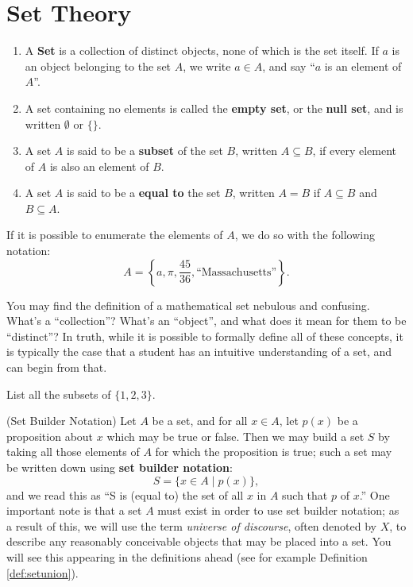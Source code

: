 \section{Set Theory}\label{sec:settheory}

\begin{definition} \leavevmode
\begin{enumerate}
    \item \label{def:set} A \textbf{Set} is a collection of distinct objects, none of which is the set itself.  If $a$ is an object belonging to the set $A$, we write $a \in A$, and say ``$a$ is an element of $A$''.
    \item \label{def:nullset} A set containing no elements is called the \textbf{empty set}, or the \textbf{null set}, and is written $\emptyset$ or $\{ \}$.
    \item \label{def:subset} A set $A$ is said to be a \textbf{subset} of the set $B$, written $A \subseteq B$, if every element of $A$ is also an element of $B$.
    \item \label{def:setequality} A set $A$ is said to be a \textbf{equal to} the set $B$, written $A = B$ if $A \subseteq B$ and $B \subseteq A$.
\end{enumerate}
\end{definition}

If it is possible to enumerate the elements of $A$, we do so with the following notation:
$$ A = \left\{ a, \pi, \frac{45}{36}, \text{``Massachusetts''}\right\}.$$

\begin{remark} You may find the definition of a mathematical set nebulous and confusing.  What's a ``collection''?  What's an ``object'', and what does it mean for them to be ``distinct''?  In truth, while it is possible to formally define all of these concepts, it is typically the case that a student has an intuitive understanding of a set, and can begin from that.
\end{remark}

\begin{exercise} List all the subsets of $\{1, 2, 3\}$.
\end{exercise}

\begin{notation} (Set Builder Notation) Let $A$ be a set, and for all $x \in A$, let $p(x)$ be a proposition about $x$ which may be true or false.  Then we may build a set $S$ by taking all those elements of $A$ for which the proposition is true; such a set may be written down using \textbf{set builder notation}:
    $$S = \{x\in A\mid p(x)\},$$
and we read this as ``S is (equal to) the set of all $x$ in $A$ such that $p$ of $x$.''  One important note is that a set $A$ must exist in order to use set builder notation; as a result of this, we will use the term \textit{universe of discourse}, often denoted by $X$, to describe any reasonably conceivable objects that may be placed into a set.  You will see this appearing in the definitions ahead (see for example Definition \ref{def:setunion}).
\end{notation}

